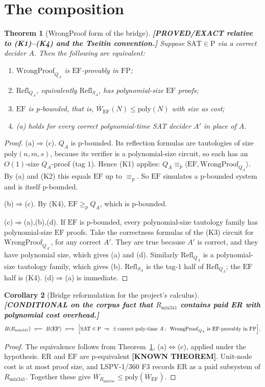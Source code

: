 \documentclass[11pt]{article}
\newtheorem{theorem}{Theorem}
\newtheorem{corollary}[theorem]{Corollary}
\theoremstyle{definition}
\theoremstyle{remark}
\newcommand{\SAT}{\mathrm{SAT}}
\newcommand{\EF}{\mathrm{EF}}
\newcommand{\FP}{\mathrm{FP}}
\newcommand{\WP}{\mathrm{WrongProof}}
\newcommand{\Refl}{\mathrm{Refl}}
\newcommand{\status}[1]{\textbf{[#1]}}
\begin{document}
\section{The composition}

\begin{theorem}[WrongProof form of the bridge]\label{thm:wp}
\status{PROVED/EXACT relative to (K1)--(K4) and the Tseitin convention.}
Suppose $\SAT\in\mathrm P$ via a correct decider $A$. Then the following are equivalent:
\begin{enumerate}
\item[(a)] $\WP_{Q_A}$ is $\EF$-provably in $\FP$;
\item[(b)] $\Refl_{Q_A}$, equivalently $\Refl_{S_A}$, has polynomial-size $\EF$ proofs;
\item[(c)] $\EF$ is p-bounded, that is, $\overline W_{\EF}(N)\le\mathrm{poly}(N)$ with size as cost;
\item[(d)] (a) holds for \emph{every} correct polynomial-time SAT decider $A'$ in place of $A$.
\end{enumerate}
\end{theorem}
\begin{proof}
(a)$\Rightarrow$(c). $Q_A$ is p-bounded. Its reflection formulas are tautologies of size
$\mathrm{poly}(n,m,s)$, because its verifier is a polynomial-size circuit, so each has an $O(1)$-size $Q_A$-proof (tag $1$).
Hence (K1) applies: $Q_A\equiv_p\langle\EF,\WP_{Q_A}\rangle$. By (a) and (K2) this equals $\EF$ up to $\equiv_p$.
So $\EF$ simulates a p-bounded system and is itself p-bounded.

(b)$\Rightarrow$(c). By (K4), $\EF\ge_p Q_A$, which is p-bounded.

(c)$\Rightarrow$(a),(b),(d). If $\EF$ is p-bounded, every polynomial-size tautology family has
polynomial-size $\EF$ proofs. Take the correctness formulas of the (K3) circuit for $\WP_{Q_{A'}}$, for any correct $A'$.
They are true because $A'$ is correct, and they have polynomial size, which gives (a) and (d). Similarly
$\Refl_{Q_A}$ is a polynomial-size tautology family, which gives (b). $\Refl_{S_A}$ is the tag-$1$ half of $\Refl_{Q_A}$;
the $\EF$ half is (K4). (d)$\Rightarrow$(a) is immediate.
\end{proof}

\begin{corollary}[Bridge reformulation for the project's calculus]
\status{CONDITIONAL on the corpus fact that $R_{\mathrm{mix341}}$ contains paid ER with polynomial cost overhead.}
\[
B(R_{\mathrm{mix341}})\ \Longleftarrow\ B(\EF)\ \Longleftrightarrow\
\Bigl[\SAT\in\mathrm P\ \Rightarrow\ \exists\text{ correct poly-time }A:\ \WP_{Q_A}\text{ is }\EF\text{-provably in }\FP\Bigr].
\]
\end{corollary}
\begin{proof}
The equivalence follows from Theorem~\ref{thm:wp}, (a)$\Leftrightarrow$(c), applied under the hypothesis.
ER and $\EF$ are p-equivalent \status{KNOWN THEOREM}. Unit-node cost is at most proof size, and LSPV-1/360 F3 records ER as a paid
subsystem of $R_{\mathrm{mix341}}$. Together these give $\overline W_{R_{\mathrm{mix341}}}\le\mathrm{poly}(\overline W_{\EF})$.
\end{proof}
\end{document}

